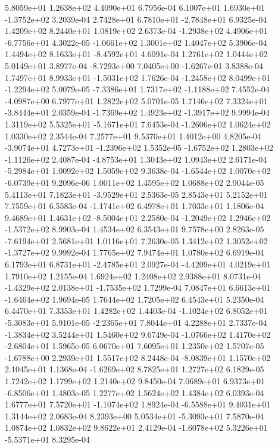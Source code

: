 5.8059e+01 1.2638e+02 4.4090e+01  6.7956e-04
 6.1007e+01  1.6930e+01 -1.3752e+02  3.2039e-04
 2.7428e+01  6.7810e+01 -2.7848e+01  6.9325e-04
1.4209e+02 8.2440e+01 1.0819e+02  2.6373e-04
-1.2938e+02  4.4906e+01 -6.7756e+01  4.3022e-05
-1.0661e+02  1.3001e+02  1.4047e+02  5.3906e-04
 1.4494e+02  8.1633e+01 -8.4592e+01  4.6091e-04
1.2761e+02 1.0444e+02 5.0149e+01  3.8977e-04
-8.7293e+00  7.0405e+00 -1.6267e-01  3.8388e-04
 1.7497e+01  8.9933e+01 -1.5031e+02  1.7626e-04
-1.2458e+02  8.0499e+01 -1.2294e+02  5.0079e-05
-7.3386e+01  1.7317e+02 -1.1188e+02  7.4552e-04
-4.0987e+00  6.7977e+01  1.2822e+02  5.0701e-05
 1.7146e+02  7.3324e+01 -3.8444e+01  2.0359e-04
-1.7369e+02  1.4923e+02 -1.3917e+02  9.9994e-04
 1.3119e+02  5.5325e+01 -5.1671e+01  7.6453e-04
-1.2606e+02  1.0624e+02  1.0330e+02  2.3544e-04
7.2577e+01 9.5370e+01 1.4012e+00  4.8205e-04
-3.9074e+01  4.7273e+01 -1.2396e+02  1.5352e-05
-1.6752e+02  1.2803e+02 -1.1126e+02  2.4087e-04
-4.8753e+01  1.3043e+02  1.0943e+02  2.6171e-04
-5.2984e+01  1.0092e+02  1.5059e+02  9.3638e-04
-1.6544e+02  1.0070e+02 -6.0739e+01  9.2096e-06
1.0011e+02 1.4595e+02 1.0688e+02  2.9044e-05
 5.4113e+01  7.1823e+01 -3.9529e+01  2.5363e-05
2.8543e+01 5.2152e+01 7.7559e+01  6.5583e-04
-1.1741e+02  6.4978e+01  1.7033e+01  1.1806e-04
 9.4689e+01  1.4631e+02 -8.5004e+01  2.2580e-04
-1.2049e+02  1.2946e+02 -1.5372e+02  8.9903e-04
1.4534e+02 6.3543e+01 9.7578e+00  2.8263e-05
-7.6194e+01  2.5681e+01  1.0116e+01  7.2630e-05
 1.3412e+02  1.3052e+02 -1.3727e+02  9.9992e-04
1.7765e+02 7.9474e+01 1.0780e+02  6.6919e-04
 6.1793e+01  6.8731e+01 -2.4785e+01  2.0927e-04
-4.4209e+01  4.0219e+01  1.7910e+02  1.2155e-04
1.6924e+02 1.2408e+02 2.9388e+01  8.0731e-04
-1.4329e+02  2.0138e+01 -1.7535e+02  1.7299e-04
 7.0847e+01  6.6613e+01 -1.6464e+02  1.9694e-05
1.7644e+02 1.7205e+02 6.4543e+01  5.2350e-04
6.4470e+01 7.3353e+01 1.4282e+02  1.4403e-04
-1.1024e+02  6.8052e+01 -5.3083e+01  5.9101e-05
-2.2365e+01  7.8044e+01  4.2288e+01  2.7337e-04
-1.3834e+02  3.5244e+01  1.5460e+02  9.6749e-04
-1.0766e+02  1.4170e+02 -2.6804e+01  1.5965e-05
6.0670e+01 7.6095e+01 1.2350e+02  1.5707e-05
-1.6788e+00  2.2939e+01  1.5517e+02  8.2448e-04
-8.0839e+01  1.1570e+02  2.1045e+01  1.1368e-04
-1.6269e+02  8.7825e+01  1.2727e+02  6.1829e-05
1.7242e+02 1.1799e+02 1.2140e+02  9.8450e-04
 7.0689e+01  6.9373e+01 -6.8506e+01  1.4803e-05
1.2277e+02 1.5624e+02 1.4384e+02  6.0393e-04
 1.6777e+01  7.5720e+01 -1.1074e+02  1.8924e-04
-6.5588e+01  9.4031e+01  1.3144e+02  2.0683e-04
 8.2393e+00  5.0534e+01 -5.3093e+01  7.5870e-04
1.0874e+02 1.0832e+02 9.8622e+01  2.4129e-04
-1.6078e+02  5.3226e+01 -5.5371e+01  8.3295e-04
